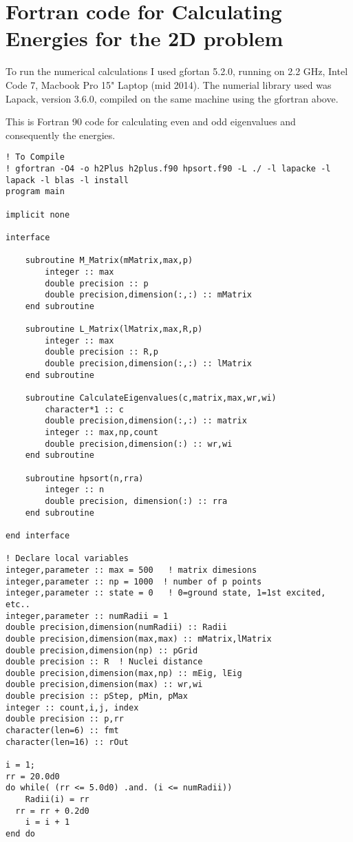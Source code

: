 \chapter{Fortran code for Calculating Energies for the 2D problem}
\label{AppendixD}

To run the numerical calculations I used gfortan 5.2.0, running on 2.2 GHz, Intel Code 7, Macbook Pro 15" Laptop (mid 2014). The numerial library used was Lapack, version 3.6.0, compiled on the same machine using the gfortran above.

This is Fortran 90 code for calculating even and odd eigenvalues and consequently the energies.

\begin{verbatim}
! To Compile 
! gfortran -O4 -o h2Plus h2plus.f90 hpsort.f90 -L ./ -l lapacke -l lapack -l blas -l install
program main

implicit none

interface 

	subroutine M_Matrix(mMatrix,max,p)
		integer :: max
		double precision :: p
		double precision,dimension(:,:) :: mMatrix
	end subroutine

	subroutine L_Matrix(lMatrix,max,R,p)
		integer :: max
		double precision :: R,p
		double precision,dimension(:,:) :: lMatrix
	end subroutine

	subroutine CalculateEigenvalues(c,matrix,max,wr,wi)
		character*1 :: c
		double precision,dimension(:,:) :: matrix
		integer :: max,np,count
		double precision,dimension(:) :: wr,wi
	end subroutine 

	subroutine hpsort(n,rra)
		integer :: n
		double precision, dimension(:) :: rra
	end subroutine 

end interface

! Declare local variables
integer,parameter :: max = 500   ! matrix dimesions
integer,parameter :: np = 1000  ! number of p points 
integer,parameter :: state = 0   ! 0=ground state, 1=1st excited, etc.. 
integer,parameter :: numRadii = 1
double precision,dimension(numRadii) :: Radii
double precision,dimension(max,max) :: mMatrix,lMatrix
double precision,dimension(np) :: pGrid
double precision :: R  ! Nuclei distance
double precision,dimension(max,np) :: mEig, lEig 
double precision,dimension(max) :: wr,wi
double precision :: pStep, pMin, pMax
integer :: count,i,j, index
double precision :: p,rr
character(len=6) :: fmt
character(len=16) :: rOut

i = 1;
rr = 20.0d0
do while( (rr <= 5.0d0) .and. (i <= numRadii))
	Radii(i) = rr
  rr = rr + 0.2d0
	i = i + 1
end do


\end{verbatim}
